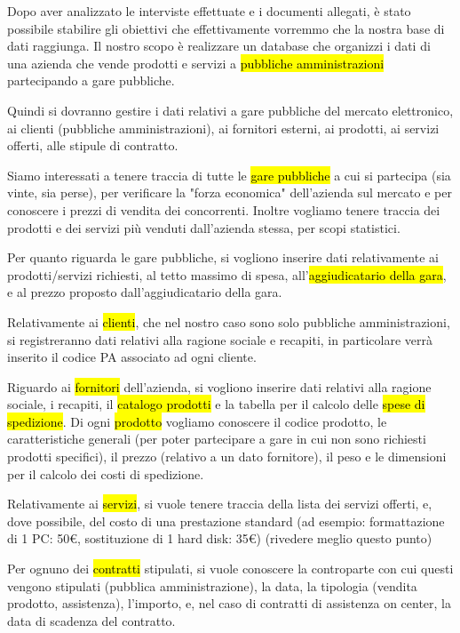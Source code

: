 
Dopo aver analizzato le interviste effettuate e i documenti allegati, è stato possibile stabilire gli obiettivi che effettivamente vorremmo che la nostra base di dati raggiunga.
Il nostro scopo è realizzare un database che organizzi i dati di una azienda che vende prodotti e servizi a \hl{pubbliche amministrazioni} partecipando a gare pubbliche.


\noindent
\newline
Quindi si dovranno gestire i dati relativi a gare pubbliche del mercato elettronico, ai clienti (pubbliche amministrazioni), ai fornitori esterni, ai prodotti, ai servizi offerti, alle stipule di contratto.

\noindent
\newline
Siamo interessati a tenere traccia di tutte le \hl{gare pubbliche} a cui si partecipa (sia vinte, sia perse), per verificare la "forza economica" dell'azienda sul mercato e per conoscere i prezzi di vendita dei concorrenti.
Inoltre vogliamo tenere traccia dei prodotti e dei servizi più venduti dall'azienda stessa, per scopi statistici.

\noindent
\newline
Per quanto riguarda le gare pubbliche, si vogliono inserire dati relativamente ai prodotti/servizi richiesti, al tetto massimo di spesa, all'\hl{aggiudicatario della gara}, e al prezzo proposto dall'aggiudicatario della gara.

\noindent
\newline
Relativamente ai \hl{clienti}, che nel nostro caso sono solo pubbliche amministrazioni, si registreranno dati relativi alla ragione sociale e recapiti, in particolare verrà inserito il codice PA associato ad ogni cliente.

\noindent
\newline
Riguardo ai \hl{fornitori} dell'azienda, si vogliono inserire dati relativi alla ragione sociale, i recapiti, il \hl{catalogo prodotti} e la tabella per il calcolo delle \hl{spese di spedizione}.
Di ogni \hl{prodotto} vogliamo conoscere il codice prodotto, le caratteristiche generali (per poter partecipare a gare in cui non sono richiesti prodotti specifici), il prezzo (relativo a un dato fornitore), il peso e le dimensioni per il calcolo dei costi di spedizione.

\noindent
\newline
Relativamente ai \hl{servizi}, si vuole tenere traccia della lista dei servizi offerti, e, dove possibile, del costo di una prestazione standard (ad esempio: formattazione di 1 PC: 50€, sostituzione di 1 hard disk: 35€) (rivedere meglio questo punto)

\noindent
\newline
Per ognuno dei \hl{contratti} stipulati, si vuole conoscere la controparte con cui questi vengono stipulati (pubblica amministrazione), la data, la tipologia (vendita prodotto, assistenza), l'importo, e, nel caso di contratti di assistenza on center, la data di scadenza del contratto.

\newpage
